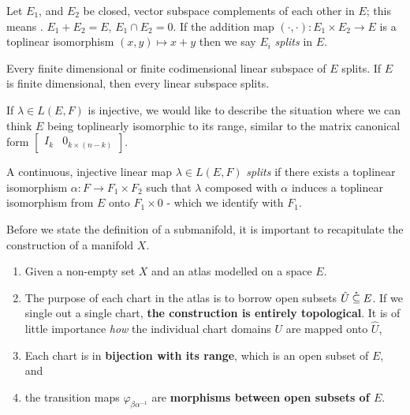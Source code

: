 \documentclass[../main-manifolds.tex]{subfiles}
\begin{document}


\begin{definition}[Splitting in $E$]\label{def:splitting-subspace}
Let $E_1$, and $E_2$ be closed, vector subspace complements of each other in $E$; this means . $E_1 + E_2 = E$, $E_1\cap E_2 = 0$. If the addition map $(\cdot,\cdot): E_1\times E_2\to E$ is a toplinear isomorphism $(x,y)\mapsto x + y$ then we say $E_i$ \emph{splits} in $E$.    
\end{definition}
\begin{remark}
Every finite dimensional or finite codimensional linear subspace of $E$ splits. If $E$ is finite dimensional, then every linear subspace splits.    
\end{remark}
If $\lambda\in L(E,F)$ is injective, we would like to describe the situation where we can think $E$ being toplinearly isomorphic to its range, similar to the matrix canonical form $\begin{bmatrix}I_{k} & 0_{k\times (n-k)} \end{bmatrix}$.
\begin{definition}[Splitting in $L(E,F)$]\label{def:splitting-clm}
A continuous, injective linear map $\lambda\in L(E,F)$ \emph{splits} if there exists a toplinear isomorphism $\alpha: F\to F_1\times F_2$ such that $\lambda$ composed with $\alpha$ induces a toplinear isomorphism from $E$ onto $F_1\times 0$ - which we identify with $F_1$.
\end{definition}
Before we state the definition of a submanifold, it is important to recapitulate the construction of a manifold $X$.
\begin{enumerate}
    \item Given a non-empty set $X$ and an atlas modelled on a space $E$.
    \item The purpose of each chart in the atlas is to borrow open subsets $\hat{U}\:\mathring{\subseteq}\: E$. If we single out a single chart, \textbf{the construction is entirely topological}. It is of little importance \emph{how} the individual chart domains $U$ are mapped onto $\hat{U}$,
    \item Each chart is in \textbf{bijection with its range}, which is an open subset of $E$, and
    \item the transition maps $\varphi_{\beta\alpha^{-1}}$ are \textbf{morphisms between open subsets of $E$}.
\end{enumerate}
\end{document}
